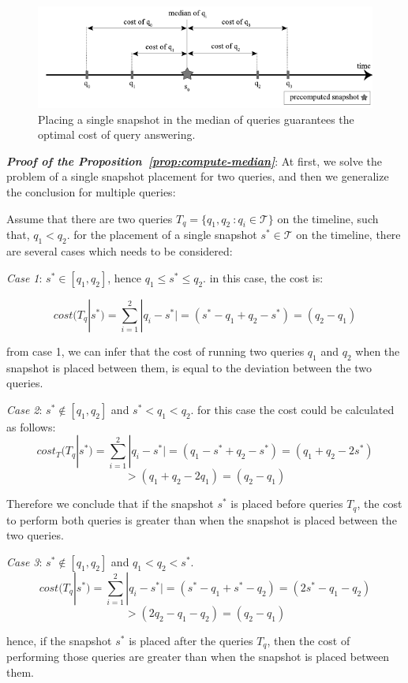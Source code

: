 		\begin{figure}
			\centering
			\includegraphics[width=\textwidth]{figs/optimal_materialization.pdf}
			\caption{Placing a single snapshot in the median of queries guarantees the optimal cost of query answering.}
			\label{fig:optimal_materialization}
		\end{figure}

		\textbf{\emph{Proof of the Proposition~\ref{prop:compute-median}}}:
			At first, we solve the problem of a single snapshot placement for two queries, and then we generalize the conclusion for multiple queries:

			Assume that there are two queries $T_q=\{q_1,q_2\ : q_i \in \mathcal{T}\}$ on the timeline, such that, $q_1<q_2$. for the placement of a single snapshot $s^* \in \mathcal{T}$ on the timeline, there are several cases which needs to be considered:

			\emph{Case 1}:
			$s^* \in [q_1,q_2]$, hence $q_1\leq s^*\leq q_2$.
			in this case, the cost is:

			$$cost(T_q|s^*)=\sum_{i=1}^2|q_i-s^*| = (s^*-q_1+q_2-s^*)=(q_2-q_1)$$

			from case 1, we can infer that the cost of running two queries $q_1$ and $q_2$ when the snapshot is placed between them, is equal to the deviation between the two queries.

			\emph{Case 2}:
			$s^* \notin [q_1,q_2]$ and $s^* < q_1 < q_2$. for this case the cost could be calculated as follows:
			$$cost_T(T_q|s^*)=\sum_{i=1}^2|q_i-s^*| = (q_1-s^*+q_2-s^*)=(q_1+q_2-2s^*) $$$$>(q_1+q_2-2q_1)=(q_2-q_1)$$

			Therefore we conclude that if the snapshot $s^*$ is placed before queries $T_q$, the cost to perform both queries is greater than when the snapshot is placed between the two queries.

			\emph{Case 3}:
			$s^* \notin [q_1,q_2]$ and $q_1 < q_2 < s^*$.
			$$cost(T_q|s^*)=\sum_{i=1}^2|q_i-s^*| = (s^*-q_1+s^*-q_2)=(2s^*-q_1-q_2) $$$$>(2q_2-q_1-q_2)=(q_2-q_1)$$

			hence, if the snapshot $s^*$ is placed after the queries $T_q$, then the cost of performing those queries are greater than when the snapshot is placed between them.

